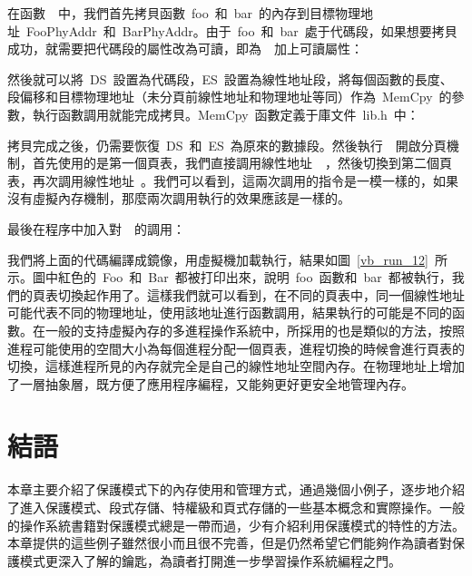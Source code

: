 
在函數~~中，我們首先拷貝函數~foo~和~bar~的內存到目標物理地址~FooPhyAddr~和~BarPhyAddr。由于~foo~和~bar~處于代碼段，如果想要拷貝成功，就需要把代碼段的屬性改為可讀，即為~~加上可讀屬性：


然後就可以將~DS~設置為代碼段，ES~設置為線性地址段，將每個函數的長度、段偏移和目標物理地址（未分頁前線性地址和物理地址等同）作為~MemCpy~的參數，執行函數調用就能完成拷貝。MemCpy~函數定義于庫文件~lib.h~中：


拷貝完成之後，仍需要恢復~DS~和~ES~為原來的數據段。然後執行~~開啟分頁機制，首先使用的是第一個頁表，我們直接調用線性地址~~，然後切換到第二個頁表，再次調用線性地址~。我們可以看到，這兩次調用的指令是一模一樣的，如果沒有虛擬內存機制，那麼兩次調用執行的效果應該是一樣的。

最後在程序中加入對~~的調用：



我們將上面的代碼編譯成鏡像，用虛擬機加載執行，結果如圖~\ref{vb_run_12}~所示。圖中紅色的~Foo~和~Bar~都被打印出來，說明~foo~函數和~bar~都被執行，我們的頁表切換起作用了。這樣我們就可以看到，在不同的頁表中，同一個線性地址可能代表不同的物理地址，使用該地址進行函數調用，結果執行的可能是不同的函數。在一般的支持虛擬內存的多進程操作系統中，所採用的也是類似的方法，按照進程可能使用的空間大小為每個進程分配一個頁表，進程切換的時候會進行頁表的切換，這樣進程所見的內存就完全是自己的線性地址空間內存。在物理地址上增加了一層抽象層，既方便了應用程序編程，又能夠更好更安全地管理內存。

\section{結語}

本章主要介紹了保護模式下的內存使用和管理方式，通過幾個小例子，逐步地介紹了進入保護模式、段式存儲、特權級和頁式存儲的一些基本概念和實際操作。一般的操作系統書籍對保護模式總是一帶而過，少有介紹利用保護模式的特性的方法。本章提供的這些例子雖然很小而且很不完善，但是仍然希望它們能夠作為讀者對保護模式更深入了解的鑰匙，為讀者打開進一步學習操作系統編程之門。
